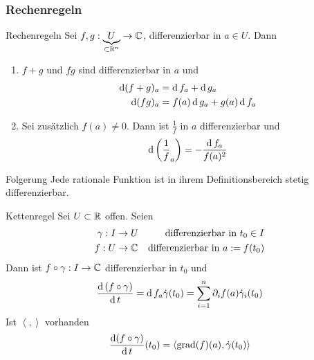 \subsubsection{Rechenregeln}
\begin{Bem}{Rechenregeln}
  Sei $f,g:\underbrace{U}_{\subset\mathbb{R}^n}\to \mathbb{C}$, differenzierbar in $a\in U$. Dann
  \begin{enumerate}
    \item $f+g$ und $fg$ sind differenzierbar in $a$ und
      \begin{align*}
        \operatorname{d}(f+g)_a&=\operatorname{d} f_a+\operatorname{d} g_a\\
        \operatorname{d}(fg)_a&=f(a)\operatorname{d} g_a+g(a)\operatorname{d} f_a
      \end{align*}
    \item Sei zusätzlich $f(a)\neq 0$. Dann ist $\frac{1}{f}$ in $a$ differenzierbar und
      \[\operatorname{d}\left( \frac{1}{f}_a \right)=-\frac{\operatorname{d} f_a}{f(a)^2}\]
  \end{enumerate}
\end{Bem}
\begin{Bem}{Folgerung}
  Jede rationale Funktion ist in ihrem Definitionsbereich stetig differenzierbar.
\end{Bem}
\begin{Sat}{Kettenregel}
  Sei $U\subset\mathbb{R}$ offen. Seien
  \begin{align*}
    \gamma:I&\to U&\text{differenzierbar in}\ t_0\in I\\
    f:U&\to\mathbb{C}&\text{differenzierbar in}\ a:=f(t_0)
  \end{align*}
  Dann ist $f\circ \gamma:I\to\mathbb{C}$ differenzierbar in $t_0$ und
  \[\frac{\operatorname{d}\left( f\circ \gamma \right)}{\operatorname{d} t}=\operatorname{d} f_a\dot \gamma(t_0)=\sum_{i=1}^n\partial_if(a)\dot\gamma_i(t_0)\]
  Ist $\left\langle , \right\rangle$ vorhanden
  \[\frac{\operatorname{d}(f\circ \gamma)}{\operatorname{d} t}(t_0)=\left\langle \operatorname{grad}(f)(a),\dot\gamma(t_0) \right\rangle\]
\end{Sat}
